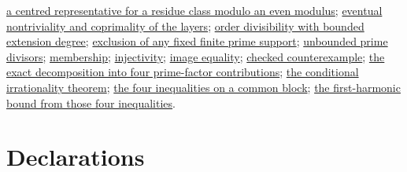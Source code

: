 \documentclass[11pt]{article}
\theoremstyle{plain}
\theoremstyle{definition}
\theoremstyle{remark}
\newcommand{\commit}{99f4bf47422abbd8757cbb22b50ba079d764d3a7}
\newcommand{\repobase}{https://github.com/wcook04/plectis-erdos/blob/\commit}
\newcommand{\mword}[4]{\href{\repobase/#1\#L#2}{#4}}
\newcommand{\lword}[4]{\href{\repobase/ErdosProblems/#1\#L#2}{#4}}
\begin{document}
\lword{Erdos249/PrimeRayCyclotomicCurvature.lean}{62}{residueClass_step_has_centred_completion}{a centred representative for a residue class modulo an even modulus};
\lword{Erdos249/PrimeRayCyclotomicCurvature.lean}{95}{PrimeRayLayerSupply}{eventual nontriviality and coprimality of the layers};
\lword{Erdos249/PrimeRayCyclotomicCurvature.lean}{102}{BoundedDegreeOrderConsumer}{order divisibility with bounded extension degree};
\lword{Erdos249/PrimeRayCyclotomicCurvature.lean}{151}{FinitePrimeSupportEscape}{exclusion of any fixed finite prime support};
\lword{Erdos249/PrimeRayCyclotomicCurvature.lean}{158}{UnboundedPrimeDivisorSupply}{unbounded prime divisors};
\mword{Erdos249257/FirstHarmonicPivot.lean}{299}{mem_pivotFiber_iff_exists_supplierPrime}{membership};
\mword{Erdos249257/FirstHarmonicPivot.lean}{367}{pivotBaseOfPrime_injective_on_supplierPrimes}{injectivity};
\mword{Erdos249257/FirstHarmonicPivot.lean}{384}{image_pivotSupplierPrimes_eq_pivotFiber}{image equality};
\mword{Erdos249257/FirstHarmonicPivot.lean}{394}{supplierPrime_not_globally_isolated_counterexample}{checked counterexample};
\mword{Erdos249257/FirstHarmonicPivot.lean}{514}{windowFirstExp_sum_eq_pivot_decomposition}{the exact decomposition into four prime-factor contributions};
\mword{Erdos249257/FirstHarmonicPivot.lean}{577}{irrational_totient_series_of_pivotResidualDecorrelation}{the conditional irrationality theorem};
\mword{Erdos249257/FirstHarmonicPivot.lean}{543}{PivotBudgetAt}{the four inequalities on a common block};
\mword{Erdos249257/FirstHarmonicPivot.lean}{549}{first_harmonic_gap_of_pivotBudgetAt}{the first-harmonic bound from those four inequalities}.


\clearpage
\section*{Declarations}
\end{document}

